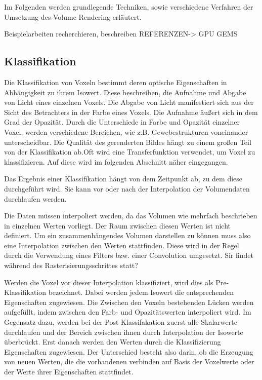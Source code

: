 Im Folgenden werden grundlegende Techniken, sowie verschiedene Verfahren der Umsetzung des Volume Rendering erläutert.

Beispielarbeiten recherchieren, beschreiben
REFERENZEN-> GPU GEMS

\subsection{Klassifikation}

Die Klassifikation von Voxeln bestimmt deren optische Eigenschaften in Abhängigkeit zu ihrem Isowert. Diese beschreiben, die Aufnahme und Abgabe von Licht eines einzelnen Voxels. Die Abgabe von Licht manifestiert sich aus der Sicht des Betrachters in der Farbe eines Voxels. Die Aufnahme äußert sich in dem Grad der Opazität. Durch die Unterschiede in Farbe und Opazität einzelner Voxel, werden verschiedene Bereichen, wie z.B. Gewebestrukturen voneinander unterscheidbar. Die Qualität des gerenderten Bildes hängt zu einem großen Teil von der Klassifikation ab.Oft wird eine Transferfunktion verwendet, um Voxel zu klassifizieren. Auf diese wird im folgenden Abschnitt näher eingegangen. 

Das Ergebnis einer Klassifikation hängt von dem Zeitpunkt ab, zu dem diese durchgeführt wird. Sie kann vor oder nach der Interpolation der Volumendaten durchlaufen werden.

Die Daten müssen interpoliert werden, da das Volumen wie mehrfach beschrieben in einzelnen Werten vorliegt. Der Raum zwischen diesen Werten ist nicht definiert. Um ein zusammenhängendes Volumen darstellen zu können muss also eine Interpolation zwischen den Werten stattfinden. Diese wird in der Regel durch die Verwendung eines Filters bzw. einer Convolution umgesetzt. Sir findet während des Rasterisierungsschrittes statt?

Werden die Voxel vor dieser Interpolation klassifiziert, wird dies als Pre-Klassifikation bezeichnet. Dabei werden jedem Isowert die entsprechenden Eigenschaften zugewiesen. Die Zwischen den Voxeln bestehenden Lücken werden aufgefüllt, indem zwischen den Farb- und Opazitätswerten interpoliert wird. 
Im Gegensatz dazu, werden bei der Post-Klassifakation zuerst alle Skalarwerte durchlaufen und der Bereich zwischen ihnen durch Interpolation der Isowerte überbrückt. Erst danach werden den Werten durch die Klassifizierung Eigenschaften zugewiesen. Der Unterschied besteht also darin, ob die Erzeugung von neuen Werten, die die vorhandenen verbinden auf Basis der Voxelwerte oder der Werte ihrer Eigenschaften stattfindet. \cite{Hadwiger06}



